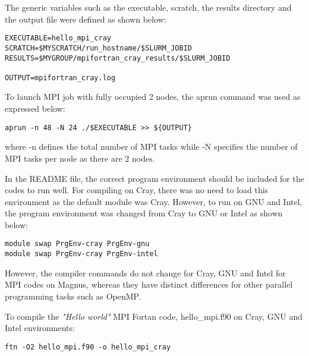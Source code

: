 The generic variables such as the executable, scratch, the results directory and the output file were defined as shown below:

\begin{tcolorbox}
\begin{Verbatim}[fontsize=\scriptsize]
EXECUTABLE=hello_mpi_cray
SCRATCH=$MYSCRATCH/run_hostname/$SLURM_JOBID
RESULTS=$MYGROUP/mpifortran_cray_results/$SLURM_JOBID

OUTPUT=mpifortran_cray.log 
\end{Verbatim}
\end{tcolorbox}

To launch MPI job with fully occupied 2 nodes, the aprun command was used as expressed below:

\begin{tcolorbox}
\begin{Verbatim}[fontsize=\scriptsize]
aprun -n 48 -N 24 ./$EXECUTABLE >> ${OUTPUT}
\end{Verbatim}
\end{tcolorbox}

where -n defines the total number of MPI tasks while -N specifies the number of MPI tasks per node as there are 2 nodes.

In the README file, the correct program environment should be included for the codes to run well. For compiling on Cray, there was no need to load
this environment as the default module was Cray. However, to run on GNU and Intel, the program environment was changed from Cray to GNU or Intel as
shown below:

\begin{tcolorbox}
\begin{Verbatim}[fontsize=\scriptsize]
module swap PrgEnv-cray PrgEnv-gnu
module swap PrgEnv-cray PrgEnv-intel
\end{Verbatim}
\end{tcolorbox}

However, the compiler commands do not change for Cray, GNU and Intel for MPI codes on Magnus, whereas they have distinct differences for other parallel
programming tasks such as OpenMP.

To compile the \emph{"Hello world"} MPI Fortan code, hello\_mpi.f90 on Cray, GNU and Intel environments:

\begin{tcolorbox}
\begin{Verbatim}[fontsize=\scriptsize]
ftn -O2 hello_mpi.f90 -o hello_mpi_cray
\end{Verbatim}
\end{tcolorbox}

